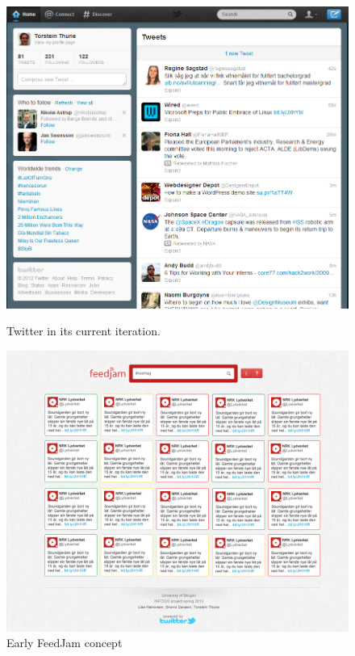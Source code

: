 \begin{figure}[ht]
    \begin{minipage}[b]{0.5\linewidth}
        \centering
        \includegraphics[width=\textwidth]{figures/twitter_list}
        \caption{Twitter in its current iteration.}
        \label{fig:Twitter}
    \end{minipage}
    \hspace{0.5cm}
    \begin{minipage}[b]{0.5\linewidth}
        \centering
        \includegraphics[width=\textwidth]{figures/layout_colour_borders}
        \caption{Early FeedJam concept}
        \label{fig:FeedJamColours}
    \end{minipage}
\end{figure}


